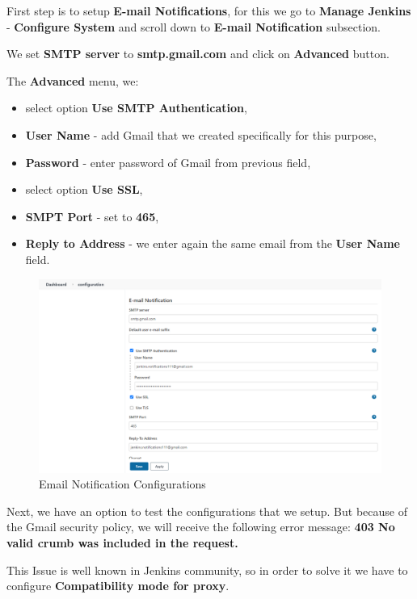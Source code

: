 \documentclass[12pt,a4paper,twoside]{article}
\begin{document}
First step is to setup \textbf{E-mail Notifications}, for this we go to \textbf{Manage Jenkins} - \textbf{Configure System} and scroll down to \textbf{E-mail Notification} subsection.


We set \textbf{SMTP server} to \textbf{smtp.gmail.com} and click on \textbf{Advanced} button.


The \textbf{Advanced} menu, we:


\begin{itemize}
	\item  select option \textbf{Use SMTP Authentication},
	\item \textbf{User Name} - add Gmail that we created specifically for this purpose,
	\item \textbf{Password} - enter password of Gmail from previous field,
	\item  select option \textbf{Use SSL},
	\item \textbf{SMPT Port} - set to \textbf{465},
	\item \textbf{Reply to Address} - we enter again the same email from the \textbf{User Name} field.
\end{itemize}


\begin{figure}[H]
    \centering
        \includegraphics[width=15cm]{images-aws/51-email-settings.png}
        \caption{Email Notification Configurations}
\end{figure}


Next, we have an option to test the configurations that we setup. But because of the Gmail security policy, we will receive the following error message: \textbf{403 No valid crumb was included in the request.}


This Issue is well known in Jenkins community, so in order to solve it we have to configure \textbf{Compatibility mode for proxy}. 
\end{document}

